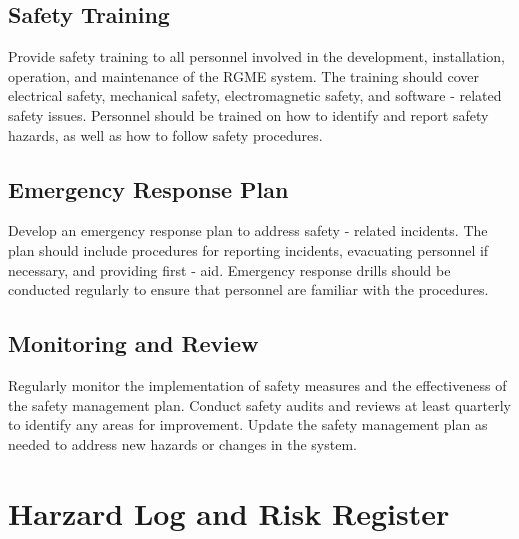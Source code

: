 \documentclass{article}
\begin{document}
\subsection{Safety Training}
Provide safety training to all personnel involved in the development, installation, operation, and maintenance of the RGME system. The training should cover electrical safety, mechanical safety, electromagnetic safety, and software - related safety issues. Personnel should be trained on how to identify and report safety hazards, as well as how to follow safety procedures.
\subsection{Emergency Response Plan}
Develop an emergency response plan to address safety - related incidents. The plan should include procedures for reporting incidents, evacuating personnel if necessary, and providing first - aid. Emergency response drills should be conducted regularly to ensure that personnel are familiar with the procedures.
\subsection{Monitoring and Review}
Regularly monitor the implementation of safety measures and the effectiveness of the safety management plan. Conduct safety audits and reviews at least quarterly to identify any areas for improvement. Update the safety management plan as needed to address new hazards or changes in the system.
\clearpage
\section{Harzard Log and Risk Register}
\end{document}

